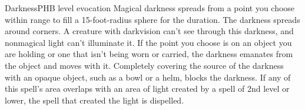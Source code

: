 \begin{spell}{Darkness}{PHB}{ level evocation}
{
}
Magical darkness spreads from a point you choose within
range to fill a 15-foot-radius sphere for the duration. The
darkness spreads around corners. A creature with darkvision
can't see through this darkness, and nonmagical light can't
illuminate it. If the point you choose is on an object you
are holding or one that isn't being worn or carried, the
darkness emanates from the object and moves with it.
Completely covering the source of the darkness with an
opaque object, such as a bowl or a helm, blocks the darkness.
If any of this spell's area overlaps with an area of light
created by a spell of 2nd level or lower, the spell that
created the light is dispelled.
\end{spell}
